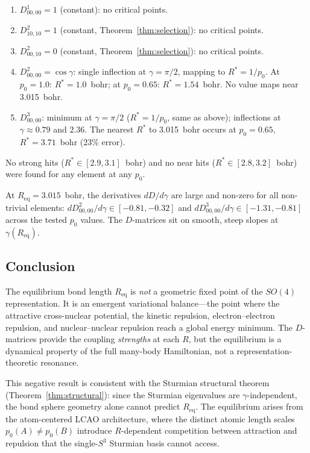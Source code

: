 \begin{enumerate}

\item $D^1_{00,00} = 1$ (constant): no critical points.

\item $D^2_{10,10} = 1$ (constant, Theorem~\ref{thm:selection}):
  no critical points.

\item $D^2_{00,10} = 0$ (constant, Theorem~\ref{thm:selection}):
  no critical points.

\item $D^2_{00,00} = \cos\gamma$: single inflection at
  $\gamma = \pi/2$, mapping to $R^* = 1/p_0$.  At $p_0 = 1.0$:
  $R^* = 1.0$~bohr; at $p_0 = 0.65$: $R^* = 1.54$~bohr.  No value
  maps near 3.015~bohr.

\item $D^3_{00,00}$: minimum at $\gamma = \pi/2$ ($R^* = 1/p_0$,
  same as above); inflections at $\gamma \approx 0.79$ and $2.36$.
  The nearest $R^*$ to 3.015~bohr occurs at $p_0 = 0.65$,
  $R^* = 3.71$~bohr (23\% error).

\end{enumerate}

No strong hits ($R^* \in [2.9, 3.1]$~bohr) and no near hits
($R^* \in [2.8, 3.2]$~bohr) were found for any element at any $p_0$.

At $R_{\text{eq}} = 3.015$~bohr, the derivatives $dD/d\gamma$ are large
and non-zero for all non-trivial elements: $dD^2_{00,00}/d\gamma \in
[-0.81, -0.32]$ and $dD^3_{00,00}/d\gamma \in [-1.31, -0.81]$
across the tested $p_0$ values.  The $D$-matrices sit on smooth,
steep slopes at $\gamma(R_{\text{eq}})$.

\subsection{Conclusion}

The equilibrium bond length $R_{\text{eq}}$ is \emph{not} a geometric
fixed point of the $SO(4)$ representation.  It is an emergent variational
balance---the point where the attractive cross-nuclear potential, the
kinetic repulsion, electron--electron repulsion, and nuclear--nuclear
repulsion reach a global energy minimum.  The $D$-matrices provide the
coupling \emph{strengths} at each $R$, but the equilibrium is a
dynamical property of the full many-body Hamiltonian, not a
representation-theoretic resonance.

This negative result is consistent with the Sturmian structural theorem
(Theorem~\ref{thm:structural}): since the Sturmian eigenvalues are
$\gamma$-independent, the bond sphere geometry alone cannot predict
$R_{\text{eq}}$.  The equilibrium arises from the atom-centered LCAO
architecture, where the distinct atomic length scales
$p_0(A) \neq p_0(B)$ introduce $R$-dependent competition between
attraction and repulsion that the single-$S^3$ Sturmian basis cannot
access.
